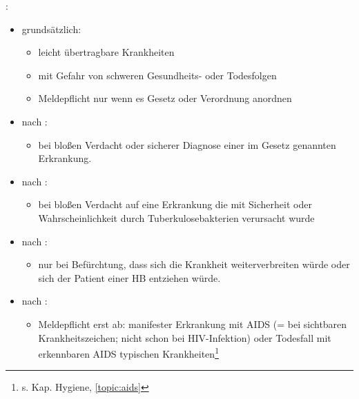 {\mdseries
{}:}

	\begin{itemize}
	\item {\mdseries
	grundsätzlich:}

	\begin{itemize}
		\item {\mdseries
		leicht \"ubertragbare Krankheiten}

		\item {\mdseries
		mit Gefahr von schweren Gesundheits- oder Todesfolgen}

		\item {\mdseries
		Meldepflicht nur wenn es Gesetz oder Verordnung anordnen}

	\end{itemize}

	\item {\mdseries
	nach : }

	\begin{itemize}
		\item {\mdseries
		bei blo{\ss}en Verdacht oder sicherer Diagnose einer im Gesetz genannten
		Erkrankung.}

	\end{itemize}

	\item {\mdseries
	nach :}

	\begin{itemize}
		\item {\mdseries
		bei blo{\ss}en Verdacht auf eine Erkrankung die mit Sicherheit oder
		Wahrscheinlichkeit durch Tuberkulosebakterien verursacht wurde}

	\end{itemize}
	
	\item {\mdseries
	nach :}

	\begin{itemize}
		\item {\mdseries
		nur bei Bef\"urchtung, dass sich die Krankheit	weiterverbreiten w\"urde oder sich der Patient einer
	HB entziehen w\"urde.}

	\end{itemize}
	
	\item {\mdseries
	nach :}

	\begin{itemize}
		\item {\mdseries
		 Meldepflicht erst ab: manifester
		Erkrankung mit AIDS (= bei sichtbaren Krankheitszeichen;
		nicht schon bei HIV-Infektion) oder Todesfall mit
		erkennbaren AIDS typischen Krankheiten\footnote{s. Kap. Hygiene, \ref{topic:aids}}}


\end{itemize}
\end{itemize}
